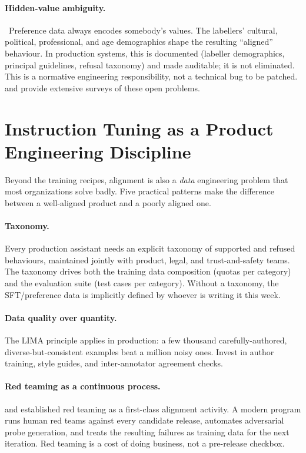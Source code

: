 \paragraph{Hidden-value ambiguity.}
\Norm\ Preference data always encodes somebody's values. The
labellers' cultural, political, professional, and age demographics
shape the resulting ``aligned'' behaviour. In production systems,
this is documented (labeller demographics, principal guidelines,
refusal taxonomy) and made auditable; it is not eliminated. This
is a normative engineering responsibility, not a technical bug to
be patched. \citet{anwar2024foundational} and
\citet{casper2023open} provide extensive surveys of these open
problems.

\section{Instruction Tuning as a Product Engineering Discipline}

Beyond the training recipes, alignment is also a \emph{data}
engineering problem that most organizations solve badly. Five
practical patterns make the difference between a well-aligned
product and a poorly aligned one.

\paragraph{Taxonomy.} Every production assistant needs an explicit
taxonomy of supported and refused behaviours, maintained jointly
with product, legal, and trust-and-safety teams. The taxonomy drives
both the training data composition (quotas per category) and the
evaluation suite (test cases per category). Without a taxonomy, the
SFT/preference data is implicitly defined by whoever is writing it
this week.

\paragraph{Data quality over quantity.}
The LIMA principle \citep{zhou2023lima} applies in production: a few
thousand carefully-authored, diverse-but-consistent examples beat a
million noisy ones. Invest in author training, style guides, and
inter-annotator agreement checks.

\paragraph{Red teaming as a continuous process.}
\citet{ganguli2022redteaming} and \citet{perez2022redteaming}
established red teaming as a first-class alignment activity. A
modern program runs human red teams against every candidate
release, automates adversarial probe generation, and treats the
resulting failures as training data for the next iteration. Red
teaming is a cost of doing business, not a pre-release checkbox.

